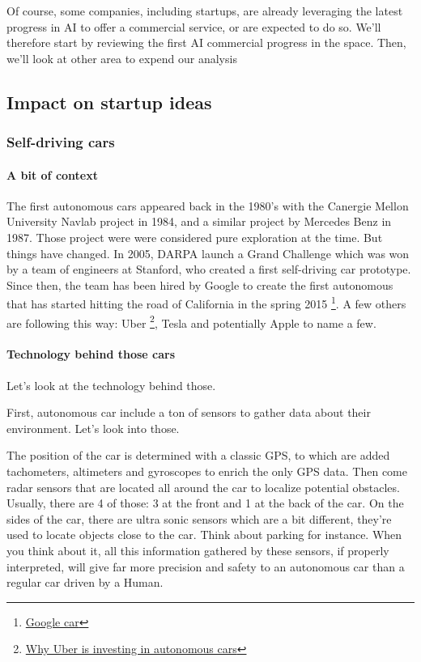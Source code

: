 \documentclass[12pt]{article}
\begin{document}
Of course, some companies, including startups, are already leveraging the latest
progress in AI to offer a commercial service, or are expected to do so.
We'll therefore start by reviewing the first AI commercial progress in the
space. Then, we'll look at other area to expend our analysis

\subsection{Impact on startup ideas}

\subsubsection{Self-driving cars}

\paragraph{A bit of context}

The first autonomous cars appeared back in the 1980's with the Canergie Mellon
University Navlab project in 1984, and a similar project by Mercedes Benz in
1987. Those project were were considered pure exploration at the time.
But things have changed. In 2005, DARPA launch a Grand Challenge which was won
by a team of engineers at Stanford, who created a first self-driving car
prototype. Since then, the team has been hired by Google to create the first
autonomous that has started hitting the road of California in the spring 2015 \footnote{\href{http://www.google.com/selfdrivingcar/}
{Google car}}.
A few others are following this way: Uber \footnote{\href{http://www.businessinsider.com/why-uber-is-investing-in-autonomous-cars-2015-8?IR=T}
{Why Uber is investing in autonomous cars}}, Tesla and potentially Apple to name
a few.

\paragraph{Technology behind those cars}

Let's look at the technology behind those.

First, autonomous car include a ton of sensors to gather data about their
environment. Let's look into those.

The position of the car is determined with a classic GPS, to which are added
tachometers, altimeters and gyroscopes to enrich the only GPS data. Then come
radar sensors that are located all around the car to localize potential
obstacles. Usually, there are 4 of those: 3 at the front and 1 at the back of
the car. On the sides of the car, there are ultra sonic sensors which are a bit
different, they're used to locate objects close to the car. Think about parking
for instance. When you think about it, all this information gathered by these sensors,
if properly interpreted, will give far more precision and safety to an autonomous car
than a regular car driven by a Human.\\
\end{document}
